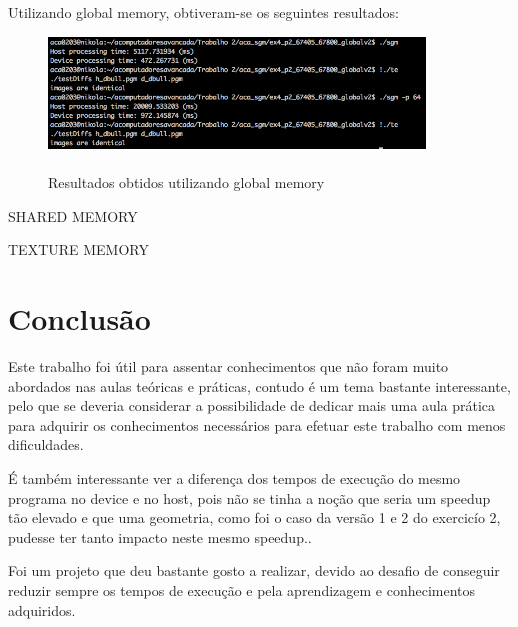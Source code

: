 \documentclass[pdftex,12pt,a4paper]{report}
\begin{document}
Utilizando global memory, obtiveram-se os seguintes resultados:

\begin{figure}[!htb]
\center
 \includegraphics[width=100mm,scale=1]{CreateDisparityGlobal.png}
 \caption{\\ Resultados obtidos utilizando global memory}
 \label{fig:CreateDisparityGlobal}
\end{figure}


SHARED MEMORY

TEXTURE MEMORY
\newpage
\section{Conclusão}

Este trabalho foi útil para assentar conhecimentos que não foram muito abordados nas aulas teóricas e práticas, contudo é um tema bastante interessante, pelo que se deveria considerar a possibilidade de dedicar mais uma aula prática para adquirir os conhecimentos necessários para efetuar este trabalho com menos dificuldades.

É também interessante ver a diferença dos tempos de execução do mesmo programa no device e no host, pois não se tinha a noção que seria um speedup tão elevado e que uma geometria, como foi o caso da versão 1 e 2 do exercicío 2, pudesse ter tanto impacto neste mesmo speedup.. 

Foi um projeto que deu bastante gosto a realizar, devido ao desafio de conseguir reduzir sempre os tempos de execução e pela aprendizagem e conhecimentos adquiridos.
\end{document}
